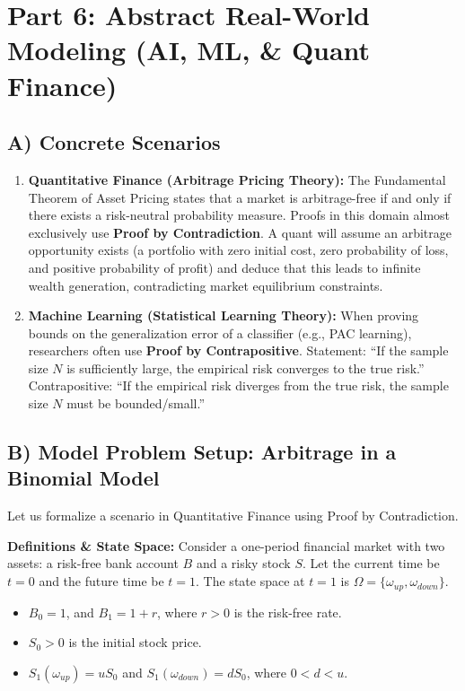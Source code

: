 \documentclass[11pt, a4paper]{article}
\theoremstyle{definition}
\theoremstyle{remark}
\begin{document}
\section{Part 6: Abstract Real-World Modeling (AI, ML, \& Quant Finance)}

\subsection{A) Concrete Scenarios}
\begin{enumerate}
    \item \textbf{Quantitative Finance (Arbitrage Pricing Theory):} The Fundamental Theorem of Asset Pricing states that a market is arbitrage-free if and only if there exists a risk-neutral probability measure. Proofs in this domain almost exclusively use \textbf{Proof by Contradiction}. A quant will assume an arbitrage opportunity exists (a portfolio with zero initial cost, zero probability of loss, and positive probability of profit) and deduce that this leads to infinite wealth generation, contradicting market equilibrium constraints.
    \item \textbf{Machine Learning (Statistical Learning Theory):} When proving bounds on the generalization error of a classifier (e.g., PAC learning), researchers often use \textbf{Proof by Contrapositive}. Statement: ``If the sample size $N$ is sufficiently large, the empirical risk converges to the true risk.'' Contrapositive: ``If the empirical risk diverges from the true risk, the sample size $N$ must be bounded/small.''
\end{enumerate}

\subsection{B) Model Problem Setup: Arbitrage in a Binomial Model}
Let us formalize a scenario in Quantitative Finance using Proof by Contradiction.

\textbf{Definitions \& State Space:}
Consider a one-period financial market with two assets: a risk-free bank account $B$ and a risky stock $S$. 
Let the current time be $t=0$ and the future time be $t=1$.
The state space at $t=1$ is $\Omega = \{\omega_{up}, \omega_{down}\}$.
\begin{itemize}
    \item $B_0 = 1$, and $B_1 = 1 + r$, where $r > 0$ is the risk-free rate.
    \item $S_0 > 0$ is the initial stock price.
    \item $S_1(\omega_{up}) = u S_0$ and $S_1(\omega_{down}) = d S_0$, where $0 < d < u$.
\end{itemize}
\end{document}
